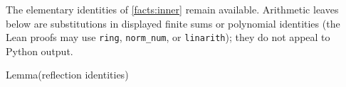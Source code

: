 \par\endgroup
The elementary identities of \ref{facts:inner} remain available. Arithmetic
leaves below are substitutions in displayed finite sums or polynomial
identities (the Lean proofs may use \texttt{ring}, \texttt{norm\_num},
or \texttt{linarith}); they do not appeal to Python output.

\begin{namedresult}{Lemma}{(reflection identities)}\label{lem:rem-reflection}
\end{namedresult}
